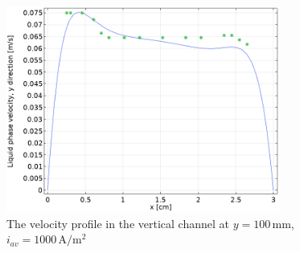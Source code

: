 \begin{figure}[H]
    \centering
    \includegraphics[width = 0.8\textwidth]{validation3.png}
    \caption{The velocity profile in the vertical channel at $y = 100 \, \mathrm{mm}$, $i_{av} = 1000 \, \mathrm{A/m^2}$}
    \label{validation3}
\end{figure}




